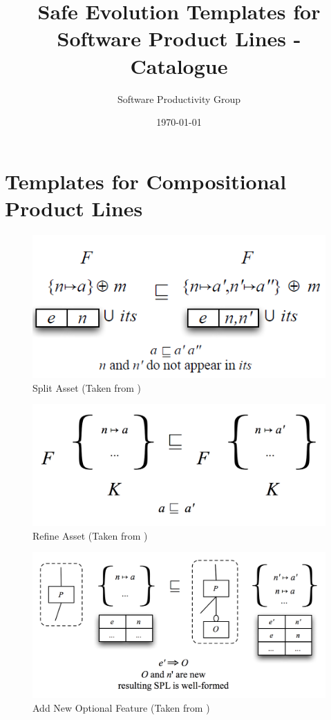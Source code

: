 \documentclass[12pt]{article}
\begin{document}
\title{Safe Evolution Templates for Software Product Lines - Catalogue} 
\author{Software Productivity Group}
\date{\today} 
\maketitle


\section{Templates for Compositional Product Lines}

\begin{figure}[H]
\centering
\includegraphics[width=1\textwidth, frame]{images/SplitAsset}
\caption{Split Asset (Taken from \cite{phdlmt})}
\end{figure}

\begin{figure}[H]
\centering
\includegraphics[width=1\textwidth, frame]{images/TemplateRefactorAsset}
\caption{Refine Asset (Taken from \cite{phdlmt})}
\end{figure}

\begin{figure}[H]
\centering
\includegraphics[width=1\textwidth, frame]{images/AddNewOptionalFeature}
\caption{Add New Optional Feature (Taken from \cite{twiki})}
\end{figure}
\end{document}
